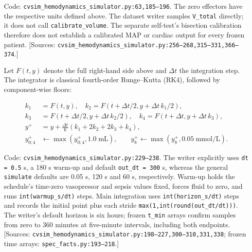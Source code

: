 Code: \texttt{cvsim\_\allowbreak{}hemodynamics\_\allowbreak{}simulator.\allowbreak{}py:\allowbreak{}63,\allowbreak{}185–\allowbreak{}196}. The zero effectors have the respective units defined above. The dataset writer samples \texttt{V\_\allowbreak{}total} directly; it does not call \texttt{calibrate\_\allowbreak{}volume}. The separate self-test's bisection calibration therefore does not establish a calibrated MAP or cardiac output for every frozen patient. [Sources: \texttt{cvsim\_\allowbreak{}hemodynamics\_\allowbreak{}simulator.\allowbreak{}py:\allowbreak{}256–\allowbreak{}268,\allowbreak{}315–\allowbreak{}331,\allowbreak{}366–\allowbreak{}374}.]

Let \(F(t,y)\) denote the full right-hand side above and \(\Delta t\) the integration step. The integrator is classical fourth-order Runge–Kutta (RK4), followed by component-wise floors:

\[
\begin{aligned}
k_1&=F(t,y),\quad k_2=F(t+\Delta t/2,y+\Delta t\,k_1/2),\\
k_3&=F(t+\Delta t/2,y+\Delta t\,k_2/2),\quad k_4=F(t+\Delta t,y+\Delta t\,k_3),\\
y^{+}&=y+\frac{\Delta t}{6}(k_1+2k_2+2k_3+k_4),\\
y^{+}_{0:4}&\leftarrow\max(y^{+}_{0:4},1.0\;\mathrm{mL}),\qquad
y^{+}_{8}\leftarrow\max(y^{+}_{8},0.05\;\mathrm{mmol/L}).
\end{aligned}
\]


Code: \texttt{cvsim\_\allowbreak{}hemodynamics\_\allowbreak{}simulator.\allowbreak{}py:\allowbreak{}229–\allowbreak{}238}. The writer explicitly uses \texttt{dt =\allowbreak{} 0.\allowbreak{}5} s, a 180 s warm-up and default \texttt{out\_\allowbreak{}dt =\allowbreak{} 300} s, whereas the general \texttt{simulate} defaults are 0.05 s, 120 s and 60 s, respectively. Warm-up holds the schedule's time-zero vasopressor and sepsis values fixed, forces fluid to zero, and runs \texttt{int(warmup\_\allowbreak{}s/\allowbreak{}dt)} steps. Main integration uses \texttt{int(horizon\_\allowbreak{}s/\allowbreak{}dt)} steps and records the initial point plus each stride \texttt{max(1,\allowbreak{}int(round(out\_\allowbreak{}dt/\allowbreak{}dt)))}. The writer's default horizon is six hours; frozen \texttt{t\_\allowbreak{}min} arrays confirm samples from zero to 360 minutes at five-minute intervals, including both endpoints. [Sources: \texttt{cvsim\_\allowbreak{}hemodynamics\_\allowbreak{}simulator.\allowbreak{}py:\allowbreak{}198–\allowbreak{}227,\allowbreak{}300–\allowbreak{}310,\allowbreak{}331,\allowbreak{}338}; frozen time arrays: \texttt{spec\_\allowbreak{}facts.\allowbreak{}py:\allowbreak{}193–\allowbreak{}218}.]

